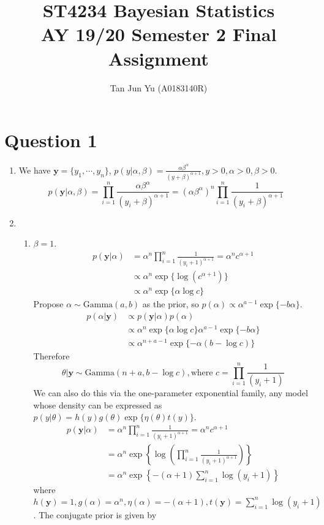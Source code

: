 \documentclass[a4paper,12pt]{article}\usepackage[]{graphicx}\usepackage[]{color}
\author{Tan Jun Yu (A0183140R)}
\title{%
	ST4234 Bayesian Statistics \\
	\large AY 19/20 Semester 2 Final Assignment}
\date{}
\newcommand{\by}{\mathbf{y}}
\newcommand{\Gammad}{\mathrm{Gamma}}
\begin{document}
\maketitle


\section*{Question 1}

\begin{enumerate}[label=(\alph*)]
\item We have $\by=\{y_1,\cdots,y_n\}$, $	p(y|\alpha,\beta)=\frac{\alpha\beta^\alpha}{(y+\beta)^{\alpha+1}},y>0,\alpha>0,\beta>0$.
$$p(\by|\alpha,\beta)=\prod_{i=1}^n\frac{\alpha\beta^\alpha}{(y_i+\beta)^{\alpha+1}}=(\alpha\beta^{\alpha})^n\prod_{i=1}^n\frac{1}{(y_i+\beta)^{\alpha+1}}$$
\item 
\begin{enumerate}[label=(\roman*)]
\item $\beta=1$.
\begin{align*}
p(\by|\alpha)&=\alpha^n\prod_{i=1}^n\frac{1}{(y_i+1)^{\alpha+1}}=\alpha^nc^{\alpha+1} \\
&\propto \alpha^n\exp\{\log(c^{\alpha+1})\} \\
&\propto \alpha^n\exp\{\alpha\log c\}
\end{align*}
Propose $\alpha\sim \Gammad(a,b)$ as the prior, so $p(\alpha)\propto \alpha^{a-1}\exp\{-b\alpha\}$.
\begin{align*}
p(\alpha|\by) &\propto p(\by|\alpha)p(\alpha) \\
&\propto \alpha^n\exp\{\alpha\log c\}\alpha^{a-1}\exp\{-b\alpha\} \\
&\propto \alpha^{n+a-1}\exp\{-\alpha(b-\log c)\}
\end{align*}
Therefore
$$\theta|\by\sim\Gammad(n+a,b-\log c), \textrm{where } c=\prod_{i=1}^n\frac{1}{(y_i+1)}$$
We can also do this via the one-parameter exponential family, any model whose density can be expressed as $p(y|\theta)=h(y)g(\theta)\exp\{\eta(\theta)t(y)\}$.
\begin{align*}
p(\by|\alpha)&=\alpha^n\prod_{i=1}^n\frac{1}{(y_i+1)^{\alpha+1}}=\alpha^nc^{\alpha+1} \\
&= \alpha^n\exp\left\{\log\left(\prod_{i=1}^n\frac{1}{(y_i+1)^{\alpha+1}}\right)\right\} \\
&= \alpha^n\exp\left\{-(\alpha+1)\sum_{i=1}^n\log(y_i+1)\right\}
\end{align*}
where $h(\by)=1,g(\alpha)=\alpha^n,\eta(\alpha)=-(\alpha+1),t(\by)=\sum_{i=1}^n\log(y_i+1)$. The conjugate prior is given by

\end{enumerate}
\end{enumerate}
\end{document}
